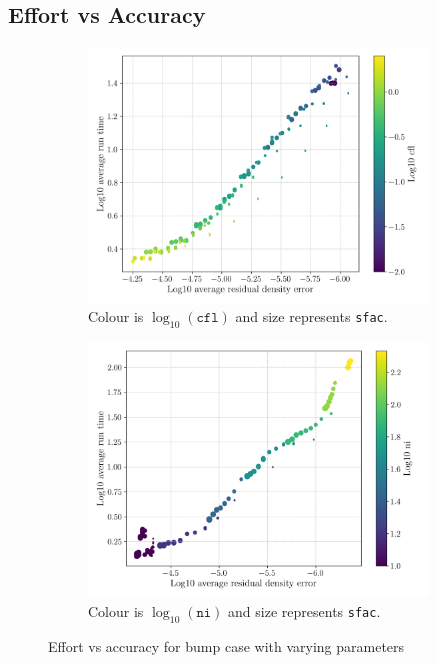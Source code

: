 \documentclass{article}
\begin{document}
\subsection{Effort vs Accuracy}

\begin{figure}[H]
    \begin{subfigure}{0.49\textwidth}
        \centering
        \includegraphics[width=0.99\textwidth]{figures/effort_vs_accuracy_cfl.png}
        \caption{Colour is $\log_{10}( \texttt{cfl})$ and size represents \texttt{sfac}.}
        \label{fig:effort_vs_accuracy_cfl}
    \end{subfigure}
    \begin{subfigure}{0.49\textwidth}
        \centering
        \includegraphics[width=0.99\textwidth]{figures/effort_vs_accuracy_ni.png}
        \caption{Colour is $\log_{10}( \texttt{ni})$ and size represents \texttt{sfac}.}
        \label{fig:effort_vs_accuracy_ni}
    \end{subfigure}
    \caption{Effort vs accuracy for bump case with varying parameters}
\end{figure}
\end{document}
